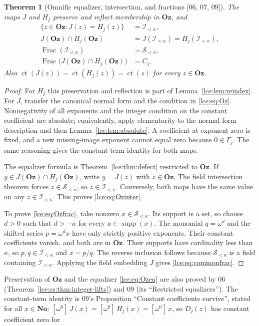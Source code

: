 \documentclass[11pt,letterpaper]{article}
\numberwithin{equation}{section}
\newtheorem{theorem}{Theorem}[section]
\theoremstyle{definition}
\theoremstyle{remark}
\newcommand{\No}{\mathbf{No}}
\newcommand{\Oz}{\mathbf{Oz}}
\newcommand{\supp}{\operatorname{supp}}
\newcommand{\ct}{\operatorname{ct}}
\newcommand{\Frac}{\operatorname{Frac}}
\newcommand{\Sk}{\mathscr S_{<\kappa}}
\newcommand{\Ik}{\mathscr I_{<\kappa}}
\newcommand{\Gam}{\Gamma_j}
\newcommand{\Common}{C_j}
\newcommand{\coef}[2]{[\omega^{#1}]\,#2}
\newcommand{\thref}[1]{Theorem~\ref{#1}}
\newcommand{\leref}[1]{Lemma~\ref{#1}}
\newcommand{\src}[1]{\textup{\textsf{\small[#1]}}}%
\begin{document}
\begin{theorem}[Omnific equalizer, intersection, and fractions \src{06, 07, 09}]\label{lce:thm:Oz}
The maps $J$ and $H_j$ preserve and reflect membership in $\Oz$, and
\begin{align}
 \{z\in\Oz:J(z)=H_j(z)\}&=\Ik,\label{lce:eq:Ozeq}\\
 J(\Oz)\cap H_j(\Oz)&=J(\Ik)=H_j(\Ik),\label{lce:eq:Ozinter}\\
 \Frac(\Ik)&=\Sk,\label{lce:eq:Ozfrac}\\
 \Frac\bigl(J(\Oz)\cap H_j(\Oz)\bigr)&=\Common.\label{lce:eq:commonfrac}
\end{align}
Also $\ct(J(z))=\ct(H_j(z))=\ct(z)$ for every $z\in\Oz$.
\end{theorem}
\begin{proof}
For $H_j$ this preservation and reflection is part of
\leref{lce:lem:reindex}. For $J$, transfer the canonical normal form and the
condition in \eqref{lce:eq:Oz}. Nonnegativity of all exponents and the integer
condition on the constant coefficient are absolute; equivalently, apply
elementarity to the normal-form description and then
\leref{lce:lem:absolute}. A coefficient at exponent zero is fixed, and a new
missing-image exponent cannot equal zero because $0\in\Gam$.
The same reasoning gives the constant-term identity for both maps.

The equalizer formula is \thref{lce:thm:defect} restricted to $\Oz$.
If $y\in J(\Oz)\cap H_j(\Oz)$, write $y=J(z)$ with $z\in\Oz$.
The field intersection theorem forces $z\in\Sk$, so $z\in\Ik$.
Conversely, both maps have the same value on any $z\in\Ik$.
This proves \eqref{lce:eq:Ozinter}.

To prove \eqref{lce:eq:Ozfrac}, take nonzero $x\in\Sk$. Its support is a
set, so choose $d>0$ such that $d>-a$ for every $a\in\supp(x)$.
The monomial $q=\omega^d$ and the shifted series $p=\omega^d x$ have
only strictly positive exponents. Their constant coefficients vanish,
and both are in $\Oz$. Their supports have cardinality less than
$\kappa$, so $p,q\in\Ik$ and $x=p/q$. The reverse inclusion follows
because $\Sk$ is a field containing $\Ik$. Applying the field embedding
$J$ gives \eqref{lce:eq:commonfrac}.
\end{proof}
Preservation of $\Oz$ and the equalizer \eqref{lce:eq:Ozeq} are also proved
by 06 (\thref{lce:cs:thm:integer-lifts}) and 09 (its ``Restricted
equalizers''). The constant-term identity is 09's Proposition ``Constant
coefficients survive'', stated for all $x\in\No$: $\coef{0}{J(x)}=
\coef{0}{H_j(x)}=\coef{0}{x}$, so $D_j(z)$ has constant coefficient zero for
\end{document}
